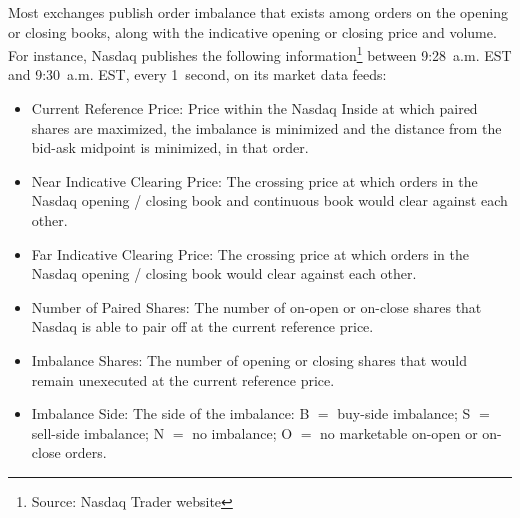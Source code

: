 Most exchanges publish order imbalance that exists among orders on the opening or closing books, along with the indicative opening or closing price and volume. For instance, Nasdaq publishes the following information\footnote{Source: Nasdaq Trader website} between 9:28~a.m. EST and 9:30~a.m. EST,  every 1~second, on its market data feeds:
        \begin{itemize}
        \item  Current Reference Price: Price within the Nasdaq Inside at which paired shares are maximized, the imbalance is minimized and the distance from the bid-ask midpoint is minimized, in that order.
        \item  Near Indicative Clearing Price: The crossing price at which orders in the Nasdaq opening / closing book and continuous book would clear against each other. 
        \item  Far Indicative Clearing Price: The crossing price at which orders in the Nasdaq opening / closing book would clear against each other. 
        \item  Number of Paired Shares: The number of on-open or on-close shares that Nasdaq is able to pair off at the current reference price. 
        \item  Imbalance Shares: The number of opening or closing shares that would remain unexecuted at the current reference price. 
        \item  Imbalance Side: The side of the imbalance: B $=$ buy-side imbalance; S $=$ sell-side imbalance; N $=$ no imbalance; O $=$ no marketable on-open or on-close orders.
        \end{itemize}

